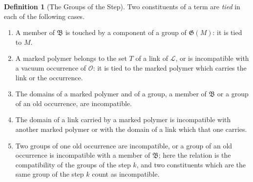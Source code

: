 \documentclass[11pt]{preprint}
\numberwithin{equation}{section}
\theoremstyle{definition}
\newtheorem{definition}[theorem]{Definition}
\theoremstyle{remark}
\theoremstyle{plain}
\begin{document}
\begin{definition}[The Groups of the Step]\label{def:groups-of-step}
Two constituents of a term are \emph{tied} in each of the following cases.
\begin{enumerate}[label=(\roman*)]
\item A member of $\mathfrak B$ is touched by a component of a group of $\mathfrak G(M)$: it is tied to $M$.
\item A marked polymer belongs to the set $T$ of a link of $\mathcal L$, or is incompatible with a vacuum occurrence of $\mathcal O$: it is tied to the marked polymer which carries the link or the occurrence.
\item The domains of a marked polymer and of a group, a member of $\mathfrak B$ or a group of an old occurrence, are incompatible.
\item The domain of a link carried by a marked polymer is incompatible with another marked polymer or with the domain of a link which that one carries.
\item Two groups of one old occurrence are incompatible, or a group of an old occurrence is incompatible with a member of $\mathfrak B$; here the relation is the compatibility of the groups of the step $k$, and two constituents which are the same group of the step $k$ count as incompatible.
\end{enumerate}

\end{definition}
\end{document}
